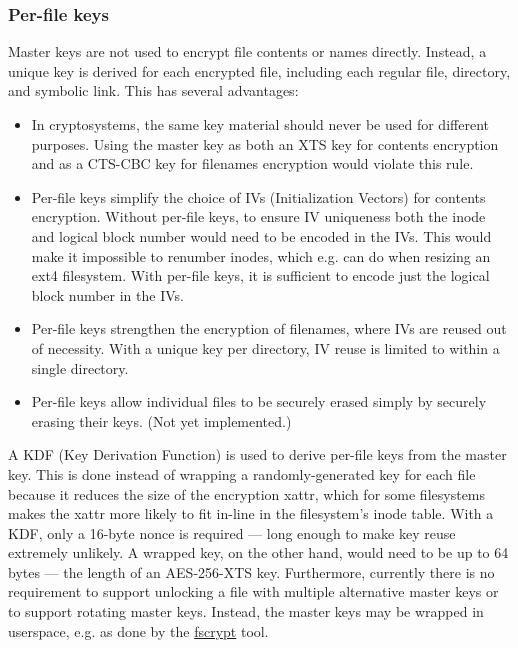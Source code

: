 \documentclass[a4paper,8pt,english]{sphinxmanual}
\begin{document}
\subsubsection{Per-file keys}
\label{filesystems/fscrypt:per-file-keys}
Master keys are not used to encrypt file contents or names directly.
Instead, a unique key is derived for each encrypted file, including
each regular file, directory, and symbolic link.  This has several
advantages:
\begin{itemize}
\item {} 
In cryptosystems, the same key material should never be used for
different purposes.  Using the master key as both an XTS key for
contents encryption and as a CTS-CBC key for filenames encryption
would violate this rule.

\item {} 
Per-file keys simplify the choice of IVs (Initialization Vectors)
for contents encryption.  Without per-file keys, to ensure IV
uniqueness both the inode and logical block number would need to be
encoded in the IVs.  This would make it impossible to renumber
inodes, which e.g.  can do when resizing an ext4
filesystem.  With per-file keys, it is sufficient to encode just the
logical block number in the IVs.

\item {} 
Per-file keys strengthen the encryption of filenames, where IVs are
reused out of necessity.  With a unique key per directory, IV reuse
is limited to within a single directory.

\item {} 
Per-file keys allow individual files to be securely erased simply by
securely erasing their keys.  (Not yet implemented.)

\end{itemize}

A KDF (Key Derivation Function) is used to derive per-file keys from
the master key.  This is done instead of wrapping a randomly-generated
key for each file because it reduces the size of the encryption xattr,
which for some filesystems makes the xattr more likely to fit in-line
in the filesystem's inode table.  With a KDF, only a 16-byte nonce is
required --- long enough to make key reuse extremely unlikely.  A
wrapped key, on the other hand, would need to be up to 64 bytes ---
the length of an AES-256-XTS key.  Furthermore, currently there is no
requirement to support unlocking a file with multiple alternative
master keys or to support rotating master keys.  Instead, the master
keys may be wrapped in userspace, e.g. as done by the \href{https://github.com/google/fscrypt}{fscrypt} tool.
\end{document}

